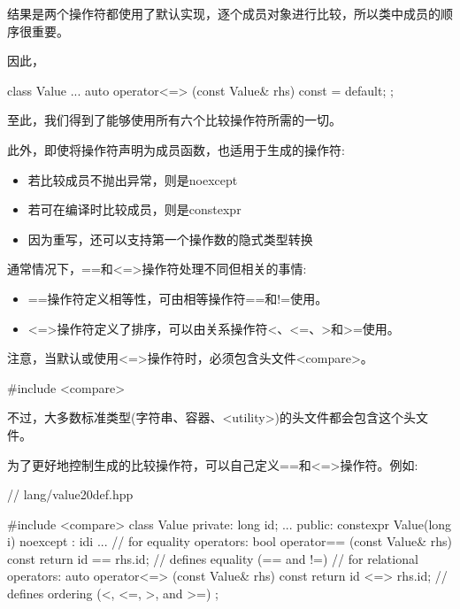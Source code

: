 结果是两个操作符都使用了默认实现，逐个成员对象进行比较，所以类中成员的顺序很重要。

因此，

\begin{cpp}
class Value {
	...
	auto operator<=> (const Value& rhs) const = default;
};
\end{cpp}

至此，我们得到了能够使用所有六个比较操作符所需的一切。

此外，即使将操作符声明为成员函数，也适用于生成的操作符:

\begin{itemize}
\item
若比较成员不抛出异常，则是noexcept

\item
若可在编译时比较成员，则是constexpr

\item
因为重写，还可以支持第一个操作数的隐式类型转换
\end{itemize}

通常情况下，==和<=>操作符处理不同但相关的事情:

\begin{itemize}
\item
==操作符定义相等性，可由相等操作符==和!=使用。

\item
<=>操作符定义了排序，可以由关系操作符<、<=、>和>=使用。
\end{itemize}

注意，当默认或使用<=>操作符时，必须包含头文件<compare>。

\begin{cpp}
#include <compare>
\end{cpp}

不过，大多数标准类型(字符串、容器、<utility>)的头文件都会包含这个头文件。


为了更好地控制生成的比较操作符，可以自己定义==和<=>操作符。例如:

\begin{cpp}
// lang/value20def.hpp

#include <compare>
class Value {
private:
	long id;
	...
public:
	constexpr Value(long i) noexcept
	: id{i} {
	}
	...
	// for equality operators:
	bool operator== (const Value& rhs) const {
		return id == rhs.id; // defines equality (== and !=)
	}
	// for relational operators:
	auto operator<=> (const Value& rhs) const {
		return id <=> rhs.id; // defines ordering (<, <=, >, and >=)
	}
};
\end{cpp}

